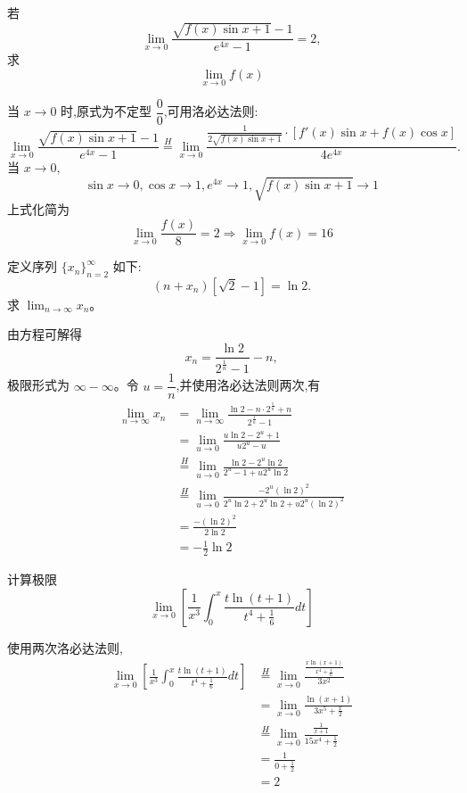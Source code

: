 \begin{questions}
    \question 若
    \[
    \lim_{x \to 0} \frac{\sqrt{f(x) \sin x + 1} - 1}{e^{4x} - 1} = 2,
    \]
    求 
    \[
    \lim_{x \to 0} f(x)
    \]
    \begin{solution}
        当 $x \to 0$ 时,原式为不定型 $\dfrac{0}{0}$,可用洛必达法则:
        \[
        \lim_{x \to 0} \frac{\sqrt{f(x) \sin x + 1} - 1}{e^{4x} - 1}
        \overset{H}{=}
        \lim_{x \to 0} 
        \frac{\frac{1}{2\sqrt{f(x)\sin x + 1}} \cdot \left[ f'(x)\sin x + f(x)\cos x \right]}
        {4e^{4x}}.
        \]
        当 $x \to 0$,
        \[
        \sin x \to 0,\cos x \to 1,e^{4x} \to 1,\sqrt{f(x)\sin x + 1} \to 1
        \]
        上式化简为
        \[
        \lim_{x \to 0} \frac{f(x)}{8} = 2
        \Rightarrow \lim_{x \to 0} f(x) = 16
        \]
    \end{solution}

    \question 定义序列 $\{x_n\}_{n=2}^\infty$ 如下:
    \[
    (n+x_n)[\sqrt{2}-1] = \ln 2.
    \]
    求 $\lim_{n\to\infty} x_n$。
    \begin{solution}
        由方程可解得
        \[
        x_n = \frac{\ln 2}{2^{\frac{1}{n}}-1} - n,
        \]
        极限形式为 $\infty - \infty$。令 $u = \dfrac{1}{n}$,并使用洛必达法则两次,有
        \begin{align*}
        \lim_{n\to\infty} x_n &= \lim_{n\to\infty} \frac{\ln 2 - n \cdot 2^{\frac{1}{n}} + n}{2^{\frac{1}{n}} - 1} \\
        &= \lim_{u\to 0} \frac{u \ln 2 - 2^u + 1}{u 2^u - u} \\
        &\overset{H}{=} \lim_{u\to 0} \frac{\ln 2 - 2^u \ln 2}{2^u - 1 + u 2^u \ln 2} \\
        &\overset{H}{=} \lim_{u\to 0} \frac{-2^u (\ln 2)^2}{2^u \ln 2 + 2^u \ln 2 + u 2^u (\ln 2)^2} \\
        &= \frac{-(\ln 2)^2}{2 \ln 2} \\
        &= -\frac{1}{2} \ln 2
        \end{align*}
    \end{solution}

    \question 计算极限
    \[
    \lim_{x\to 0} \left[\frac{1}{x^3}\int_{0}^{x} \frac{t\ln(t+1)}{t^4+\frac{1}{6}} dt\right]
    \]
    \begin{solution}
        使用两次洛必达法则,
        \begin{align*}
        \lim_{x\to 0} \left[\frac{1}{x^3}\int_{0}^{x} \frac{t\ln(t+1)}{t^4+\frac{1}{6}} dt\right]
        &\overset{H}{=} \lim_{x\to 0} \frac{\frac{x\ln(x+1)}{x^4+\frac{1}{6}}}{3x^2} \\
        &= \lim_{x\to 0} \frac{\ln(x+1)}{3x^5+\frac{x}{2}}\\
        &\overset{H}{=} \lim_{x\to 0} \frac{\frac{1}{x+1}}{15x^4+\frac{1}{2}} \\
        &=\frac{1}{0+\frac{1}{2}} \\
        &=2
        \end{align*}
    \end{solution}


\end{questions}
